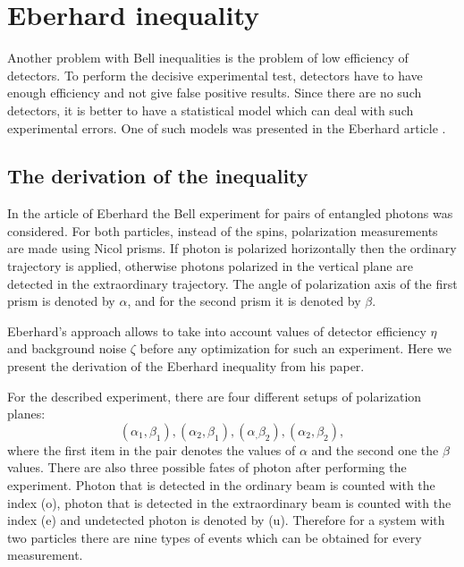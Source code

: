 \documentclass[%
master,         %
subf,           %
href,           %
colorlinks=true %
]{disser}
\numberwithin{equation}{section}
\numberwithin{figure}{section}
\begin{document}
\section{Eberhard inequality}
Another problem with Bell inequalities is the problem of low efficiency of detectors. To perform the decisive experimental test, detectors have to have enough efficiency and not give false positive results. Since there are no such detectors, it is better to have a statistical model which can deal with such experimental errors. One of such models was presented in the Eberhard article \cite{Eberhard}.


\subsection{The derivation of the inequality}
In the article of Eberhard \cite{Eberhard} the Bell experiment for pairs of entangled photons was considered. For both particles, instead of the spins, polarization measurements are made using Nicol prisms. If photon is polarized horizontally then the ordinary trajectory is applied, otherwise photons polarized in the vertical plane are detected in the extraordinary trajectory. The angle of polarization axis of the first prism is denoted by $\alpha$, and for the second prism it is denoted by $\beta$.

Eberhard's approach allows to take into account values of detector efficiency $\eta$ and background noise $\zeta$ before any optimization for such an experiment. Here we present the derivation of the Eberhard inequality from his paper. 


For the described experiment, there are four different setups of polarization planes: \[
(\alpha_1, \beta_1), (\alpha_2, \beta_1), (\alpha_, \beta_2), (\alpha_2, \beta_2),
\] 
where the first item in the pair denotes the values of $\alpha$ and the second one the $\beta$ values. There are also three possible fates of photon after performing the experiment. Photon that is detected in the ordinary beam is counted with the index (o), photon that is detected in the extraordinary beam is counted with the index (e) and undetected photon is denoted by (u). Therefore for a system with two particles there are nine types of events which can be obtained for every measurement.
\end{document}
